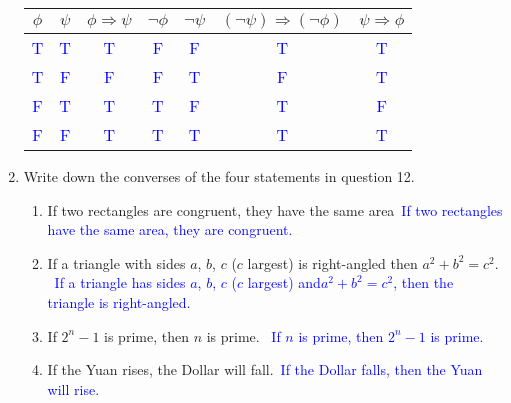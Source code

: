 \documentclass[13.5pt]{article}
\begin{document}
\begin{enumerate}
\begin{center}
\begin{tabular}{c c c c c c c}
 \(\phi\) & \(\psi\) & \(\phi \Rightarrow \psi\) & \(\neg\phi\) &\(\neg\psi\) & \((\neg\psi) \Rightarrow (\neg\phi)\) & \(\psi \Rightarrow \phi\) \\
\hline
 \textcolor{blue}{T} & \textcolor{blue}{T} & \textcolor{blue}{T} & \textcolor{blue}{F} & \textcolor{blue}{F} & \textcolor{blue}{T} & \textcolor{blue}{T} \\ 
 \textcolor{blue}{T} & \textcolor{blue}{F} & \textcolor{blue}{F} & \textcolor{blue}{F} & \textcolor{blue}{T} & \textcolor{blue}{F} & \textcolor{blue}{T}\\ 
 \textcolor{blue}{F} & \textcolor{blue}{T} & \textcolor{blue}{T} & \textcolor{blue}{T} & \textcolor{blue}{F} & \textcolor{blue}{T} & \textcolor{blue}{F}\\ 
 \textcolor{blue}{F} & \textcolor{blue}{F} & \textcolor{blue}{T} & \textcolor{blue}{T} & \textcolor{blue}{T} & \textcolor{blue}{T} & \textcolor{blue}{T}\\ 
\end{tabular}
\end{center}

\item{ Write down the converses of the four statements in question 12.}

\begin{enumerate}
\setlength{\itemindent}{.1in}
\item{If two rectangles are congruent, they have the same area}\
\textcolor{blue} {If two rectangles have the same area, they are congruent.}
\item{If a triangle with sides \(a\), \(b\), \(c\) (\(c\) largest) is right-angled then \(a^2 + b^2 = c^2. \)}\
\textcolor{blue} {If a triangle has sides \(a\), \(b\), \(c\) (\(c\) largest) and\(a^2 + b^2 = c^2\), then the triangle is right-angled.}
\item{If \(2^n-1\) is prime, then \(n\) is prime. }\
\textcolor{blue} {If \(n\) is prime, then \(2^n-1\) is prime.}
\item{If the Yuan rises, the Dollar will fall.}\
\textcolor{blue} {If the Dollar falls, then the Yuan will rise.}

\end{enumerate}

\end{enumerate}
\end{document}
